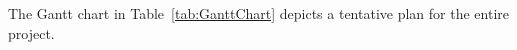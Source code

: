 The Gantt chart in Table~\ref{tab:GanttChart} depicts a tentative plan for the entire project. %







